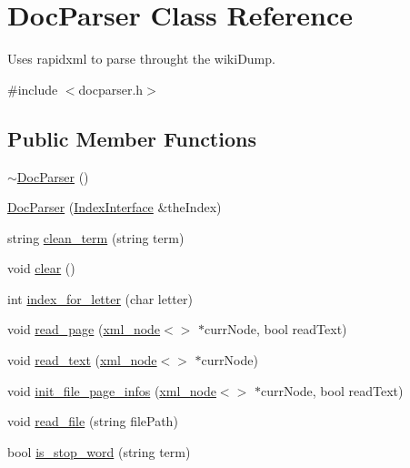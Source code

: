 \hypertarget{class_doc_parser}{}\section{Doc\+Parser Class Reference}
\label{class_doc_parser}


Uses rapidxml to parse throught the wiki\+Dump.  




{\ttfamily \#include $<$docparser.\+h$>$}

\subsection*{Public Member Functions}
\begin{DoxyCompactItemize}
\item 
\hyperlink{class_doc_parser_a637fc4d565eaf2927ee9b88bbe23e3cb}{$\sim$\+Doc\+Parser} ()
\item 
\hyperlink{class_doc_parser_a086f00e54fca8038c85c0e235948d75a}{Doc\+Parser} (\hyperlink{class_index_interface}{Index\+Interface} \&the\+Index)
\item 
string \hyperlink{class_doc_parser_a1b127af53e8af16f393b64f46c307d3a}{clean\+\_\+term} (string term)
\item 
void \hyperlink{class_doc_parser_ad92d1a6da7d413abd27ee18a6ed20a30}{clear} ()
\item 
int \hyperlink{class_doc_parser_a7addc81ac337c2688bb9e9d8197db2fc}{index\+\_\+for\+\_\+letter} (char letter)
\item 
void \hyperlink{class_doc_parser_a48cd3949baca573b9be0b4ba24b9c79d}{read\+\_\+page} (\hyperlink{classrapidxml_1_1xml__node}{xml\+\_\+node}$<$$>$ $\ast$curr\+Node, bool read\+Text)
\item 
void \hyperlink{class_doc_parser_af28153ebf0ee2fe97c2942c04c915adc}{read\+\_\+text} (\hyperlink{classrapidxml_1_1xml__node}{xml\+\_\+node}$<$$>$ $\ast$curr\+Node)
\item 
void \hyperlink{class_doc_parser_ad7b5809e4efd3e2bae781c1cb491ab29}{init\+\_\+file\+\_\+page\+\_\+infos} (\hyperlink{classrapidxml_1_1xml__node}{xml\+\_\+node}$<$$>$ $\ast$curr\+Node, bool read\+Text)
\item 
void \hyperlink{class_doc_parser_a45860ee7fb0b956c4342cd4a815818de}{read\+\_\+file} (string file\+Path)
\item 
bool \hyperlink{class_doc_parser_ad30c49de12ed45eaf2594c4718789c3e}{is\+\_\+stop\+\_\+word} (string term)
\end{DoxyCompactItemize}
